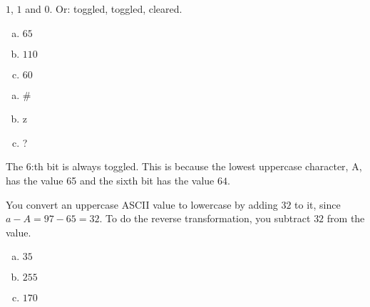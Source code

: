 \begin{Answer}[ref={bits-value-order}]
  $1$, $1$ and $0$. Or: toggled, toggled, cleared.

\end{Answer}

\begin{Answer}[ref={ascii-to-num}]

  \begin{enumerate}[(a)]
  \item $65$
  \item $110$
  \item $60$
  \end{enumerate}

\end{Answer}

\begin{Answer}[ref={num-to-ascii}]

  \begin{enumerate}[(a)]
  \item \#
  \item z
  \item ?
  \end{enumerate}

\end{Answer}

\begin{Answer}[ref={ascii-uppercase}]

  The 6:th bit is always toggled. This is because the lowest uppercase
  character, A, has the value 65 and the sixth bit has the value $64$.
\end{Answer}

\begin{Answer}[ref={uppercase-conv}]

  You convert an uppercase ASCII value to lowercase by adding $32$ to
  it, since $a - A = 97 - 65 = 32$. To do the reverse transformation,
  you subtract $32$ from the value.

\end{Answer}

\begin{Answer}[ref={hex-to-n}]

  \begin{enumerate}[(a)]
  \item $35$
  \item $255$
  \item $170$
  \end{enumerate}

\end{Answer}

